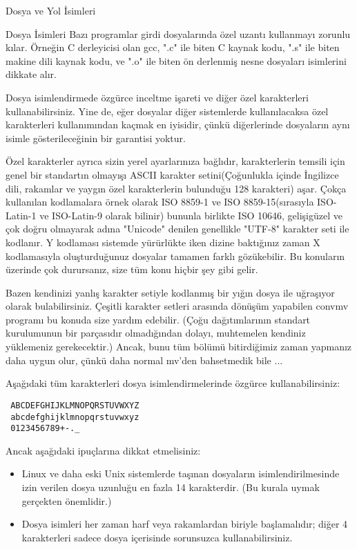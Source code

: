 \begin{section}{Dosya ve Yol İsimleri}
\begin{subsection}{Dosya İsimleri}
	Bazı programlar girdi dosyalarında özel uzantı kullanmayı zorunlu kılar. Örneğin C derleyicisi olan gcc, ".c" ile biten C kaynak kodu, ".s" ile biten makine dili kaynak kodu, ve ".o" ile biten ön derlenmiş nesne dosyaları isimlerini dikkate alır.
	
	Dosya isimlendirmede özgürce inceltme işareti ve diğer özel karakterleri kullanabilirsiniz. Yine de, eğer dosyalar diğer sistemlerde kullanılacaksa özel karakterleri kullanımından kaçmak en iyisidir, çünkü diğerlerinde dosyaların aynı isimle gösterileceğinin bir garantisi yoktur.
	
	Özel karakterler ayrıca sizin yerel ayarlarınıza bağlıdır, karakterlerin temsili için genel bir standartın olmayışı ASCII karakter setini(Çoğunlukla içinde İngilizce dili, rakamlar ve yaygın özel karakterlerin bulunduğu 128 karakteri) aşar. Çokça kullanılan kodlamalara örnek olarak ISO 8859-1 ve ISO 8859-15(sırasıyla ISO-Latin-1 ve ISO-Latin-9 olarak bilinir) bununla birlikte ISO 10646, gelişigüzel ve çok doğru olmayarak adına "Unicode" denilen genellikle "UTF-8" karakter seti ile kodlanır. Y kodlaması sistemde yürürlükte iken dizine baktığınız zaman X kodlamasıyla oluşturduğunuz dosyalar tamamen farklı gözükebilir. Bu konuların üzerinde çok durursanız, size tüm konu hiçbir şey gibi gelir.
	
	Bazen kendinizi yanlış karakter setiyle kodlanmış bir yığın dosya ile uğraşıyor olarak bulabilirsiniz. Çeşitli karakter setleri arasında dönüşüm yapabilen convmv programı bu konuda size yardım edebilir. (Çoğu dağıtımlarının standart kurulumunun bir parçasıdır olmadığından dolayı, muhtemelen kendiniz yüklemeniz gerekecektir.) Ancak, bunu tüm bölümü bitirdiğimiz zaman yapmanız daha uygun olur, çünkü daha normal mv'den bahsetmedik bile ...
	
Aşağıdaki tüm karakterleri dosya isimlendirmelerinde özgürce kullanabilirsiniz:
\begin{verbatim}
 ABCDEFGHIJKLMNOPQRSTUVWXYZ
 abcdefghijklmnopqrstuvwxyz
 0123456789+-._
\end{verbatim}

Ancak aşağıdaki ipuçlarına dikkat etmelisiniz:
\begin{itemize}
\item Linux ve daha eski Unix sistemlerde taşınan dosyaların isimlendirilmesinde izin verilen dosya uzunluğu en fazla 14 karakterdir. (Bu kurala uymak gerçekten önemlidir.)
\item Dosya isimleri her zaman harf veya rakamlardan biriyle başlamalıdır; diğer 4 karakterleri sadece dosya içerisinde sorunsuzca kullanabilirsiniz.
\end{itemize}


\end{subsection}
\end{section}
